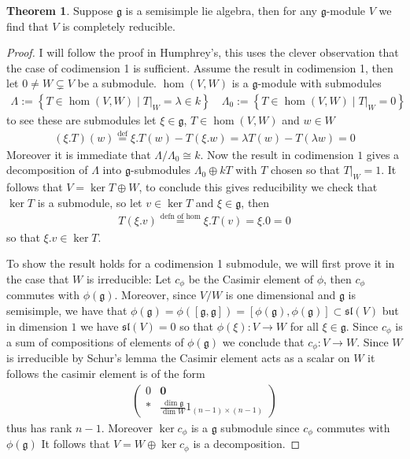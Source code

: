 \documentclass[10.5pt]{article}
\theoremstyle{definition}
\newtheorem{theorem}{Theorem}
\numberwithin{example}{subsection}
\numberwithin{pb}{subsection}
\newcommand{\set}[1]{\left\{#1\right\}}
\begin{document}
    \begin{theorem}
        Suppose \(\mathfrak{g}\) is a semisimple lie algebra, then for any \(\mathfrak{g}\)-module \(V\) we find that \(V\) is completely reducible.
    \end{theorem}
    \begin{proof}
        I will follow the proof in Humphrey's, this uses the clever observation that the case of codimension 1 is sufficient. Assume the result in codimension 1, then let \(0 \neq W \subsetneq V\) be a submodule. \(\hom(V,W)\) is a \(\mathfrak{g}\)-module with submodules
        \begin{align}
            \Lambda := \set{T \in \hom(V,W) \mid T\vert_W = \lambda \in k} \quad \Lambda_0 := \set{T \in \hom(V,W) \mid T\vert_W = 0}
        \end{align}
        to see these are submodules let \(\xi \in \mathfrak{g}\), \(T \in \hom(V,W)\) and \(w \in W\)
        \begin{align}
            (\xi.T)(w) \overset{\text{def}}{=} \xi.T(w) - T(\xi.w) = \lambda T(w) - T(\lambda w) = 0
        \end{align}
        Moreover it is immediate that \(\Lambda/\Lambda_0 \cong k\). Now the result in codimension \(1\) gives a decomposition of \(\Lambda\) into \(\mathfrak{g}\)-submodules \(\Lambda_0 \oplus kT\) with \(T\) chosen so that \(T\vert_W = 1\). It follows that \(V = \ker T \oplus W\), to conclude this gives reducibility we check that \(\ker T\) is a submodule, so let \(v \in \ker T\) and \(\xi \in \mathfrak{g}\), then
        \begin{align}
            T(\xi.v) \overset{\text{defn of hom}}{=} \xi.T(v) = \xi.0 = 0
        \end{align}
        so that \(\xi.v \in \ker T\).

        To show the result holds for a codimension 1 submodule, we will first prove it in the case that \(W\) is irreducible: Let \(c_\phi\) be the Casimir element of \(\phi\), then \(c_\phi\) commutes with \(\phi(\mathfrak{g})\). Moreover, since \(V/W\) is one dimensional and \(\mathfrak{g}\) is semisimple, we have that \(\phi(\mathfrak{g}) = \phi([\mathfrak{g},\mathfrak{g}]) = [\phi(\mathfrak{g}),\phi(\mathfrak{g})] \subset \mathfrak{sl}(V)\) but in dimension \(1\) we have \(\mathfrak{sl}(V) = 0\) so that \(\phi(\xi): V \to W\) for all \(\xi \in \mathfrak{g}\). Since \(c_\phi\) is a sum of compositions of elements of \(\phi(\mathfrak{g})\) we conclude that \(c_\phi: V \to W\). Since \(W\) is irreducible by Schur's lemma the Casimir element acts as a scalar on \(W\) it follows the casimir element is of the form
        \begin{align}
            \begin{pmatrix} 0 & \mathbf{0} \\ \mathbf{*} & \frac{\dim \mathfrak{g}}{\dim W}1_{(n-1) \times (n-1)} \end{pmatrix}
        \end{align}
        thus has rank \(n-1\). Moreover \(\ker c_\phi\) is a \(\mathfrak{g}\) submodule since \(c_\phi\) commutes with \(\phi(\mathfrak{g})\) It follows that \(V = W \oplus \ker c_\phi\) is a decomposition.


\end{proof}
\end{document}

